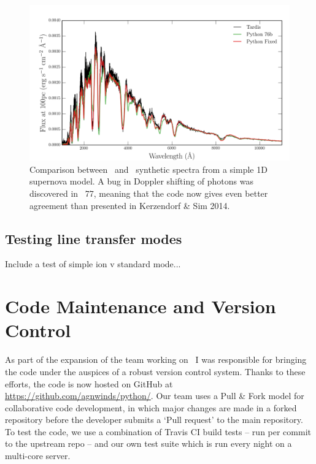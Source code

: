 \begin{figure}
\centering
\includegraphics[width=1.0\textwidth]{figures/03-radtrans/tardispython_thesis.png}
\caption{
Comparison between \tar\ and \py\ synthetic spectra from 
a simple 1D supernova model. A bug in Doppler shifting of
photons was discovered in \py\ 77, meaning that the code now gives
even better agreement than presented in Kerzendorf \& Sim 2014.
}
\label{fig:tardis_spec}
\end{figure}

\subsection{Testing line transfer modes}

Include a test of simple ion v standard mode...

\section{Code Maintenance and Version Control}
\label{sec:code_maintenance}

As part of the expansion of the team working on \py\, I was responsible
for bringing the code under the auspices of a robust version control system.
Thanks to these efforts, the code is now hosted on GitHub at 
\url{https://github.com/agnwinds/python/}. Our team uses a Pull \& Fork model
for collaborative code development, in which major changes are made in a 
forked repository before the developer submits a `Pull request' to the main 
repository. To test the code, we use a combination of Travis CI build tests 
-- run per commit to the upstream repo -- and our own test suite which is 
run every night on a multi-core server. 

